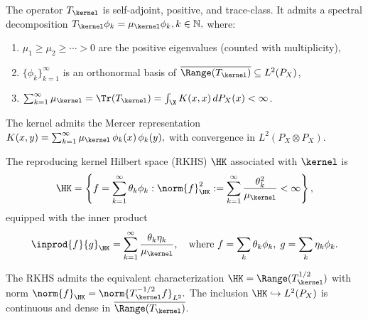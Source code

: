 \documentclass{article}
\begin{document}
\begin{theorem}
	\label{thm:spectral}
	The operator $T_\kernel$ is self-adjoint, positive, and trace-class. It admits a spectral decomposition
	$
		T_\kernel \phi_k = \mu_\kernel \phi_k, k \in \N,
	$
	where:
	\begin{enumerate}[label=(\roman*)]
		\item $\mu_1 \geq \mu_2 \geq \cdots > 0$ are the positive eigenvalues (counted with multiplicity),
		\item $\{\phi_k\}_{k=1}^\infty$ is an orthonormal basis of $\overline{\Range(T_\kernel)} \subseteq L^2(P_X)$,
		\item $\sum_{k=1}^\infty \mu_\kernel = \Tr(T_\kernel) = \int_{\X} K(x,x) \, dP_X(x) < \infty$.
	\end{enumerate}
	The kernel admits the Mercer representation
	$
		K(x, y) = \sum_{k=1}^\infty \mu_\kernel \, \phi_k(x) \, \phi_k(y),
	$
	with convergence in $L^2(P_X \otimes P_X)$.
\end{theorem}


\begin{definition}
	\label{def:rkhs}
	The reproducing kernel Hilbert space (RKHS) $\HK$ associated with $\kernel$ is
	\begin{equation}
		\HK = \left\{ f = \sum_{k=1}^\infty \theta_k \phi_k : \norm{f}_{\HK}^2 := \sum_{k=1}^\infty \frac{\theta_k^2}{\mu_\kernel} < \infty \right\},
	\end{equation}
	equipped with the inner product
	\begin{equation}
		\inprod{f}{g}_{\HK} = \sum_{k=1}^\infty \frac{\theta_k \eta_k}{\mu_\kernel}, \quad \text{where } f = \sum_k \theta_k \phi_k, \; g = \sum_k \eta_k \phi_k.
	\end{equation}
\end{definition}

\begin{proposition}
	\label{prop:rkhs-operator}
	The RKHS admits the equivalent characterization
	$
		\HK = \Range(T_\kernel^{1/2})
	$
	with norm
	$
		\norm{f}_{\HK} = \norm{T_\kernel^{-1/2} f}_{L^2}.
	$
	The inclusion $\HK \hookrightarrow L^2(P_X)$ is continuous and dense in $\overline{\Range(T_\kernel)}$.
\end{proposition}
\end{document}
